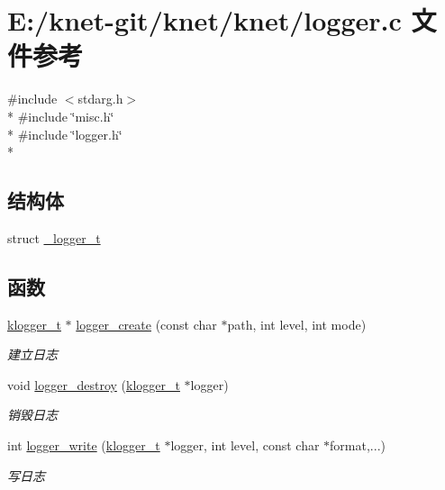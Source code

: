 \hypertarget{a00084}{}\section{E\+:/knet-\/git/knet/knet/logger.c 文件参考}
\label{a00084}
{\ttfamily \#include $<$stdarg.\+h$>$}\\*
{\ttfamily \#include \char`\"{}misc.\+h\char`\"{}}\\*
{\ttfamily \#include \char`\"{}logger.\+h\char`\"{}}\\*
\subsection*{结构体}
\begin{DoxyCompactItemize}
\item 
struct \hyperlink{a00028}{\+\_\+logger\+\_\+t}
\end{DoxyCompactItemize}
\subsection*{函数}
\begin{DoxyCompactItemize}
\item 
\hyperlink{a00066_a1926fbbc891c0da81a8e683ac83deb05_a1926fbbc891c0da81a8e683ac83deb05}{klogger\+\_\+t} $\ast$ \hyperlink{a00084_a90a43dbe09a661b50fad128da4ffce87_a90a43dbe09a661b50fad128da4ffce87}{logger\+\_\+create} (const char $\ast$path, int level, int mode)
\begin{DoxyCompactList}\small\item\em 建立日志 \end{DoxyCompactList}\item 
void \hyperlink{a00084_a4a445d874f7523df4fa17b909c47035c_a4a445d874f7523df4fa17b909c47035c}{logger\+\_\+destroy} (\hyperlink{a00066_a1926fbbc891c0da81a8e683ac83deb05_a1926fbbc891c0da81a8e683ac83deb05}{klogger\+\_\+t} $\ast$logger)
\begin{DoxyCompactList}\small\item\em 销毁日志 \end{DoxyCompactList}\item 
int \hyperlink{a00084_a863a5bcdd307b15bfb224afa4b4f9be1_a863a5bcdd307b15bfb224afa4b4f9be1}{logger\+\_\+write} (\hyperlink{a00066_a1926fbbc891c0da81a8e683ac83deb05_a1926fbbc891c0da81a8e683ac83deb05}{klogger\+\_\+t} $\ast$logger, int level, const char $\ast$format,...)
\begin{DoxyCompactList}\small\item\em 写日志 \end{DoxyCompactList}\end{DoxyCompactItemize}
